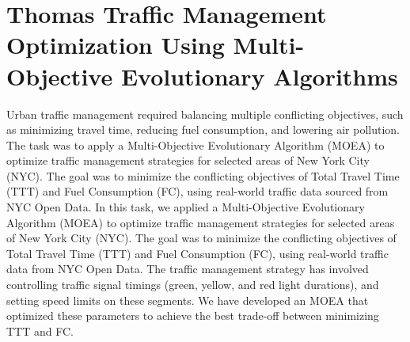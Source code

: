 \section{Thomas Traffic Management Optimization Using Multi-Objective Evolutionary Algorithms}
Urban traffic management required balancing multiple conflicting objectives, such as minimizing travel time, reducing fuel consumption, and lowering air pollution. The task was to apply a Multi-Objective Evolutionary Algorithm (MOEA) to optimize traffic management strategies for selected areas of New York City (NYC). The goal was to minimize the conflicting objectives of Total Travel Time (TTT) and Fuel Consumption (FC), using real-world traffic data sourced from NYC Open Data.
\newline
\newline
In this task, we applied a Multi-Objective Evolutionary Algorithm (MOEA) to optimize traffic management strategies for selected areas of New York City (NYC). The goal was to minimize the conflicting objectives of Total Travel Time (TTT) and Fuel Consumption (FC), using real-world traffic data from NYC Open Data. 
\newline
The traffic management strategy has involved controlling traffic signal timings (green, yellow, and red light durations), and setting speed limits on these segments. We have developed an MOEA that optimized these parameters to achieve the best trade-off between minimizing TTT and FC.
\newline
